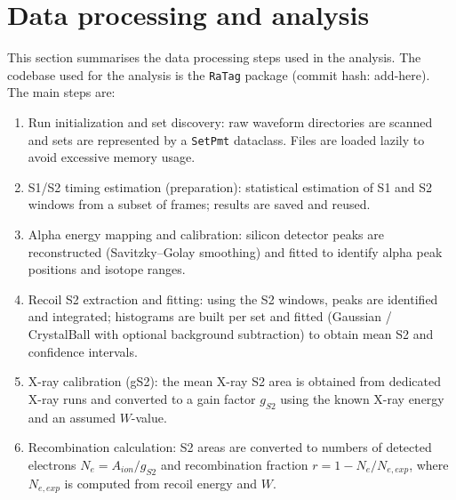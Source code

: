 \section{Data processing and analysis}
\label{sec:methods}

This section summarises the data processing steps used in the analysis. The codebase used for the analysis is the \texttt{RaTag} package (commit hash: add-here). The main steps are:

\begin{enumerate}
  \item Run initialization and set discovery: raw waveform directories are scanned and sets are represented by a \texttt{SetPmt} dataclass. Files are loaded lazily to avoid excessive memory usage.
  \item S1/S2 timing estimation (preparation): statistical estimation of S1 and S2 windows from a subset of frames; results are saved and reused.
  \item Alpha energy mapping and calibration: silicon detector peaks are reconstructed (Savitzky--Golay smoothing) and fitted to identify alpha peak positions and isotope ranges.
  \item Recoil S2 extraction and fitting: using the S2 windows, peaks are identified and integrated; histograms are built per set and fitted (Gaussian / CrystalBall with optional background subtraction) to obtain mean S2 and confidence intervals.
  \item X-ray calibration (gS2): the mean X-ray S2 area is obtained from dedicated X-ray runs and converted to a gain factor $g_{S2}$ using the known X-ray energy and an assumed $W$-value.
  \item Recombination calculation: S2 areas are converted to numbers of detected electrons $N_e= A_{ion}/g_{S2}$ and recombination fraction $r=1 - N_e/N_{e,exp}$, where $N_{e,exp}$ is computed from recoil energy and $W$.
\end{enumerate}

